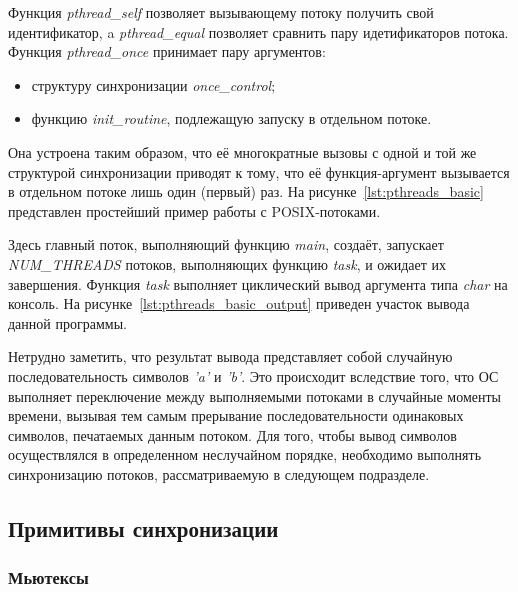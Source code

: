 Функция \textit{pthread\_self} позволяет вызывающему потоку получить свой идентификатор,
a \textit{pthread\_equal} позволяет сравнить пару идетификаторов потока.
Функция \textit{pthread\_once} принимает пару аргументов:
\begin{itemize}
  \item структуру синхронизации \textit{once\_control};
  \item функцию \textit{init\_routine}, подлежащую запуску в отдельном потоке.
\end{itemize}

Она устроена таким образом, что её многократные вызовы с одной и той же структурой синхронизации
приводят к тому, что её функция-аргумент вызывается в отдельном потоке лишь один (первый) раз.
На рисунке~\ref{lst:pthreads_basic} представлен простейший пример работы с POSIX-потоками.
\pagebreak



Здесь главный поток, выполняющий функцию \textit{main},
создаёт, запускает \textit{NUM\_THREADS} потоков, выполняющих функцию \textit{task},
и ожидает их завершения. Функция \textit{task} выполняет циклический вывод
аргумента типа \textit{char} на консоль. На рисунке~\ref{lst:pthreads_basic_output}
приведен участок вывода данной программы.
\pagebreak



Нетрудно заметить, что результат вывода представляет собой случайную
последовательность символов \textit{'a'} и \textit{'b'}.
Это происходит вследствие того, что ОС выполняет переключение между
выполняемыми потоками в случайные моменты времени, вызывая тем самым прерывание
последовательности одинаковых символов, печатаемых данным потоком.
Для того, чтобы вывод символов осуществлялся в определенном неслучайном порядке,
необходимо выполнять синхронизацию потоков, рассматриваемую в следующем подразделе.

\subsection{Примитивы синхронизации}

\subsubsection{Мьютексы}
\label{subsubsec:pthreads_mutex}

